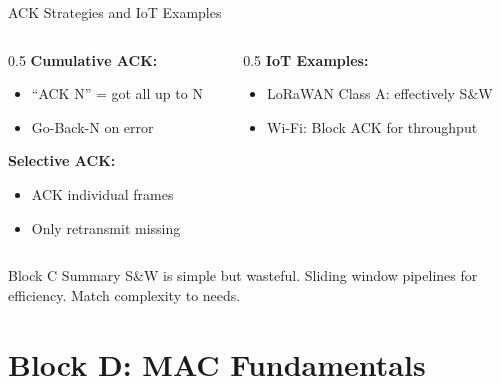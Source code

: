 \documentclass[aspectratio=169,11pt]{beamer}
\begin{document}
\begin{frame}{ACK Strategies and IoT Examples}
    \begin{columns}[T]
        \begin{column}{0.5\textwidth}
            \textbf{Cumulative ACK:}
            \begin{itemize}
                \item ``ACK N'' = got all up to N
                \item Go-Back-N on error
            \end{itemize}
            
            \textbf{Selective ACK:}
            \begin{itemize}
                \item ACK individual frames
                \item Only retransmit missing
            \end{itemize}
        \end{column}
        \begin{column}{0.5\textwidth}
            \textbf{IoT Examples:}
            \begin{itemize}
                \item LoRaWAN Class A: effectively S\&W
                \item Wi-Fi: Block ACK for throughput
            \end{itemize}
        \end{column}
    \end{columns}
    
    \begin{block}{Block C Summary}
        S\&W is simple but wasteful. Sliding window pipelines for efficiency. Match complexity to needs.
    \end{block}
\end{frame}

\section{Block D: MAC Fundamentals}
\end{document}
